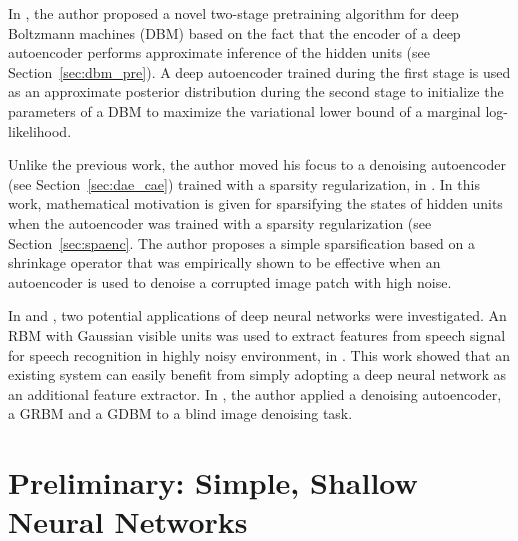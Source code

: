 \documentclass[dissertation,nocontribution,draft*]{aaltoseries}
\begin{document}
In \textbf{}, the author proposed a
novel two-stage pretraining algorithm for deep Boltzmann
machines (DBM) based on the fact that the encoder of a deep
autoencoder performs approximate inference of the hidden
units (see Section~\ref{sec:dbm_pre}).  A deep autoencoder
trained during the first stage is used as an approximate
posterior distribution during the second stage to initialize
the parameters of a DBM to maximize the variational lower
bound of a marginal log-likelihood. 

Unlike the previous work, the author moved his focus to a
denoising autoencoder (see Section~\ref{sec:dae_cae})
trained with a sparsity regularization, in
\textbf{}. In this work, mathematical motivation
is given for sparsifying the states of hidden units when the
autoencoder was trained with a sparsity regularization (see
Section~\ref{sec:spaenc}. The
author proposes a simple sparsification based on a shrinkage
operator that was empirically shown to be effective when an
autoencoder is used to denoise a corrupted image patch with
high noise.


In \textbf{} and
\textbf{}, two potential applications
of deep neural networks were investigated. An RBM with
Gaussian visible units was used to extract features from
speech signal for speech recognition in highly noisy
environment, in . This work showed
that an existing system can easily benefit from simply
adopting a deep neural network as an additional feature
extractor. In , the author applied a
denoising autoencoder, a GRBM and a GDBM to a blind image
denoising task.












\chapter{Preliminary: Simple, Shallow Neural Networks}
\label{chapter:simple_neural_networks}
\end{document}
